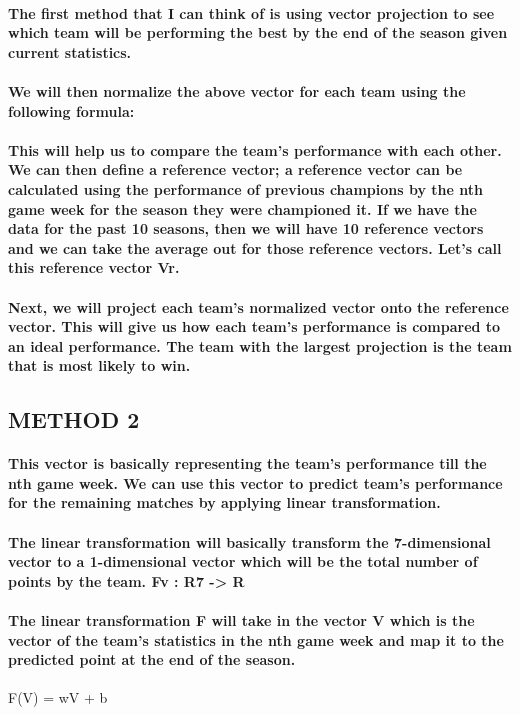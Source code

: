\documentclass[11pt]{article} %
\begin{document}
\paragraph{The first method that I can think of is using vector projection to see which team will be performing the best by the end of the season given current statistics.}
% 
% 
\paragraph{We will then normalize the above vector for each team using the following formula:}
% 
% 
\paragraph{This will help us to compare the team's performance with each other.
We can then define a reference vector; a reference vector can be calculated using the performance of previous champions by the nth game week for the season they were championed it. If we have the data for the past 10 seasons, then we will have 10 reference vectors and we can take the average out for those reference vectors. Let's call this reference vector Vr.}
\paragraph{Next, we will project each team's normalized vector onto the reference vector. This will give us how each team's performance is compared to an ideal performance.
The team with the largest projection is the team that is most likely to win.}
% 
% 
% 
% 
\subsection{METHOD 2}
\paragraph{This vector is basically representing the team's performance till the nth game week. We can use this vector to predict team's performance for the remaining matches by applying linear transformation.}
\paragraph{The linear transformation will basically transform the 7-dimensional vector to a 1-dimensional vector which will be the total number of points by the team.
Fv : R7 -> R}
\paragraph{The linear transformation F will take in the vector V which is the vector of the team's statistics in the nth game week and map it to the predicted point at the end of the season.}
F(V) = wV + b
\end{document}
